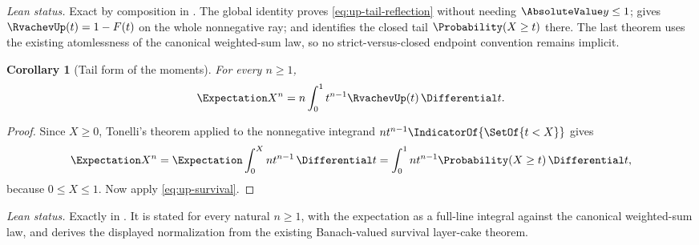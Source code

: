 \documentclass[11pt,a4paper,oneside,openany]{book}
\newtheorem{corollary}[corollary]{Corollary}
\theoremstyle{definition}
\theoremstyle{remark}
\begin{document}
\emph{Lean status.}  Exact by composition in
.  The global identity
 proves
\eqref{eq:up-tail-reflection} without needing $\AbsoluteValue y\le1$;
 gives
$\RvachevUp(t)=1-F(t)$ on the whole nonnegative ray; and
identifies the closed tail $\Probability(X\ge t)$ there.  The last theorem
uses the existing atomlessness of the canonical weighted-sum law, so no
strict-versus-closed endpoint convention remains implicit.

\begin{corollary}[Tail form of the moments]\label{cor:up-moments}
For every $n\ge1$,
\begin{equation}\label{eq:up-moment-integral}
 \Expectation X^n=n\int_0^1t^{n-1}\RvachevUp(t)\,\Differential t.
\end{equation}
\end{corollary}

\begin{proof}
Since $X\ge0$, Tonelli's theorem applied to the nonnegative integrand
$nt^{n-1}\IndicatorOf{\SetOf{t<X}}$ gives
\[
 \Expectation X^n
 =\Expectation\int_0^Xnt^{n-1}\,\Differential t
 =\int_0^1nt^{n-1}\Probability(X\ge t)\,\Differential t,
\]
because $0\le X\le1$.  Now apply \eqref{eq:up-survival}.
\end{proof}

\emph{Lean status.}  Exactly
in .  It is stated for every natural
$n\ge1$, with the expectation as a full-line integral against the canonical
weighted-sum law, and derives the displayed normalization from the existing
Banach-valued survival layer-cake theorem.
\end{document}
